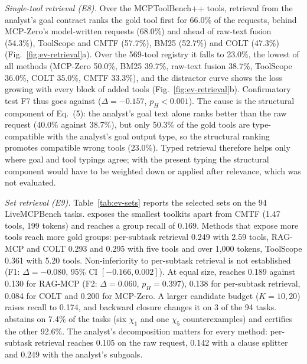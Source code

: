 \emph{Single-tool retrieval (E8).} Over the MCPToolBench++ tools, retrieval from the analyst's goal contract ranks
the gold tool first for 66.0\% of the requests, behind MCP-Zero's model-written requests (68.0\%) and ahead of
raw-text fusion (54.3\%), ToolScope and CMTF (57.7\%), BM25 (52.7\%) and COLT (47.3\%)
(Fig.~\ref{fig:ev-retrieval}a). Over the 569-tool registry it falls to 23.0\%, the lowest of all methods
(MCP-Zero 50.0\%, BM25 39.7\%, raw-text fusion 38.7\%, ToolScope 36.0\%, COLT 35.0\%, CMTF 33.3\%), and the
distractor curve shows the loss growing with every block of added tools (Fig.~\ref{fig:ev-retrieval}b).
Confirmatory test F7 thus goes against \pamcp{} ($\Delta=-0.157$, $p_H<0.001$). The cause is the structural
component of Eq.~(5): the analyst's goal text alone ranks better than the raw request (40.0\% against 38.7\%),
but only 50.3\% of the gold tools are type-compatible with the analyst's goal output type, so the structural
ranking promotes compatible wrong tools (23.0\%). Typed retrieval therefore helps only where goal and tool typings
agree; with the present typing the structural component would have to be weighted down or applied after
relevance, which was not evaluated.



\emph{Set retrieval (E9).} Table~\ref{tab:ev-sets} reports the selected sets on the 94 LiveMCPBench tasks.
\pamcp{} exposes the smallest toolkits apart from CMTF (1.47 tools, 199 tokens) and reaches a group recall of
0.169. Methods that expose more tools reach more gold groups: per-subtask retrieval 0.249 with 2.59 tools, RAG-MCP
and COLT 0.293 and 0.295 with five tools and over 1,000 tokens, ToolScope 0.361 with 5.20 tools. Non-inferiority
to per-subtask retrieval is not established (F1: $\Delta=-0.080$, 95\% CI $[-0.166, 0.002]$). At equal size,
\pamcp{} reaches 0.189 against 0.130 for RAG-MCP (F2: $\Delta=0.060$, $p_H=0.397$), 0.138 for per-subtask
retrieval, 0.084 for COLT and 0.200 for MCP-Zero. A larger candidate budget ($K=10, 20$) raises recall to 0.174,
and backward closure changes it on 3 of the 94 tasks. \pamcp{} abstains on 7.4\% of the tasks (six $\chi_1$ and one
$\chi_5$ counterexamples) and certifies the other 92.6\%. The analyst's decomposition matters for every method:
per-subtask retrieval reaches 0.105 on the raw request, 0.142 with a clause splitter and 0.249 with the analyst's
subgoals.


